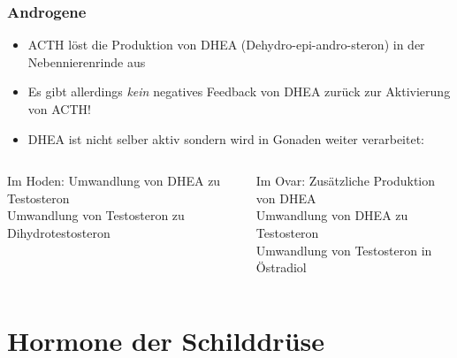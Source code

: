 \documentclass{beamer}
\begin{document}
\begin{frame}
\frametitle{Androgene}

\pause

\begin{itemize}
\item
ACTH löst die Produktion von DHEA (Dehydro-epi-andro-steron) in der Nebennierenrinde aus
\item 
Es gibt allerdings \emph{kein} negatives Feedback von DHEA zurück zur Aktivierung von ACTH!
\pause
\item
DHEA ist nicht selber aktiv sondern wird in Gonaden weiter verarbeitet: 
\end{itemize}

\begin{columns}[t]
\begin{column}{5cm}
\begin{block}{Im Hoden:}
Umwandlung von DHEA zu Testosteron\\
Umwandlung von Testosteron zu Dihydrotestosteron \\
\end{block}
\end{column}


\begin{column}{5cm}
\begin{block}{Im Ovar:}
Zusätzliche Produktion von DHEA \\
Umwandlung von DHEA zu Testosteron\\
Umwandlung von Testosteron in Östradiol \\
\end{block}
\end{column}
\end{columns}

\end{frame}


\section{Hormone der Schilddrüse}



\end{document}
